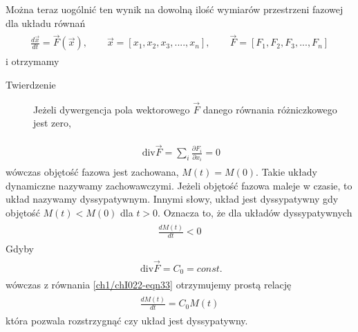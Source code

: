 \documentclass[a4paper,12pt,polish]{sphinxmanual}
\begin{document}
Można teraz uogólnić ten wynik na dowolną ilość wymiarów przestrzeni fazowej  dla układu równań
\label{ch1/chI022:equation-eqn34}\begin{gather}
\begin{split}\frac{d\vec x}{dt} = \vec F (\vec x), \qquad \vec x = [x_1, x_2, x_3, ...., x_n], \qquad \vec F = [F_1, F_2, F_3, ..., F_n]\end{split}\label{ch1/chI022-eqn34}
\end{gather}
i otrzymamy
\begin{description}
\item[{Twierdzenie}] \leavevmode
Jeżeli dywergencja pola wektorowego $\vec F$  danego równania różniczkowego jest zero,

\end{description}
\label{ch1/chI022:equation-eqn35}\begin{gather}
\begin{split}\mbox{ div} \vec F = \sum_i \frac{\partial F_i}{\partial x_i} = 0\end{split}\label{ch1/chI022-eqn35}
\end{gather}
wówczas objętość fazowa jest zachowana, $M(t) = M(0)$. Takie układy dynamiczne nazywamy zachowawczymi. Jeżeli objętość fazowa maleje w czasie, to układ nazywamy dyssypatywnym. Innymi słowy, układ jest dyssypatywny gdy objętość $M(t) < M(0)$ dla $t>0$. Oznacza to, że dla układów dyssypatywnych
\label{ch1/chI022:equation-eqn36}\begin{gather}
\begin{split}\frac{dM(t)}{dt} < 0\end{split}\label{ch1/chI022-eqn36}
\end{gather}
Gdyby
\label{ch1/chI022:equation-eqn37}\begin{gather}
\begin{split}\mbox{ div} \vec F = C_0 = const.\end{split}\label{ch1/chI022-eqn37}
\end{gather}
wówczas z równania \eqref{ch1/chI022-eqn33} otrzymujemy prostą relację
\label{ch1/chI022:equation-eqn38}\begin{gather}
\begin{split}\frac{dM(t)}{dt} = C_0 M(t)\end{split}\label{ch1/chI022-eqn38}
\end{gather}
która pozwala rozstrzygnąć czy układ jest dyssypatywny.
\end{document}

